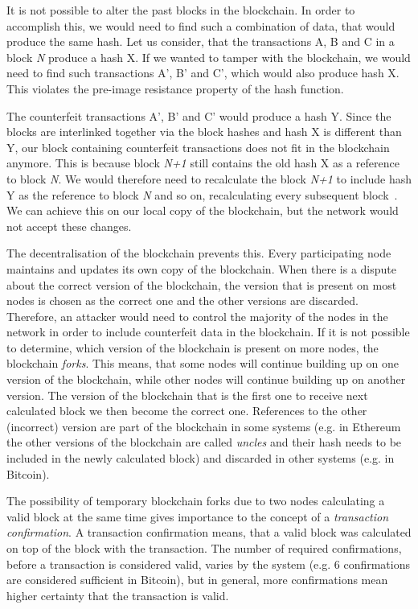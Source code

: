 It is not possible to alter the past blocks in the blockchain. In order to accomplish this, we would need to find such a combination of data, that would produce the same hash. Let us consider, that the transactions A, B and C in a block \textit{N} produce a hash X. If we wanted to tamper with the blockchain, we would need to find such transactions A', B' and C', which would also produce hash X. This violates the pre-image resistance property of the hash function.

The counterfeit transactions A', B' and C' would produce a hash Y. Since the blocks are interlinked together via the block hashes and hash X is different than Y, our block containing counterfeit transactions does not fit in the blockchain anymore. This is because block \textit{N+1} still contains the old hash X as a reference to block \textit{N}. We would therefore need to recalculate the block \textit{N+1} to include hash Y as the reference to block \textit{N} and so on, recalculating every subsequent block~\cite[3]{NakamotoBitcoin:System}. We can achieve this on our local copy of the blockchain, but the network would not accept these changes.

The decentralisation of the blockchain prevents this. Every participating node maintains and updates its own copy of the blockchain. When there is a dispute about the correct version of the blockchain, the version that is present on most nodes is chosen as the correct one and the other versions are discarded. Therefore, an attacker would need to control the majority of the nodes in the network in order to include counterfeit data in the blockchain. If it is not possible to determine, which version of the blockchain is present on more nodes, the blockchain \textit{forks}. This means, that some nodes will continue building up on one version of the blockchain, while other nodes will continue building up on another version. The version of the blockchain that is the first one to receive next calculated block we then become the correct one. References to the other (incorrect) version are part of the blockchain in some systems (e.g. in Ethereum the other versions of the blockchain are called \textit{uncles} and their hash needs to be included in the newly calculated block) and discarded in other systems (e.g. in Bitcoin).

The possibility of temporary blockchain forks due to two nodes calculating a valid block at the same time gives importance to the concept of a \textit{transaction confirmation}. A transaction confirmation means, that a valid block was calculated on top of the block with the transaction. The number of required confirmations, before a transaction is considered valid, varies by the system (e.g. 6 confirmations are considered sufficient in Bitcoin), but in general, more confirmations mean higher certainty that the transaction is valid\footnotemark.
% 

